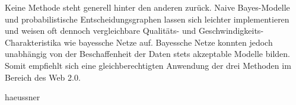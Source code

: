 \documentclass[a4paper,10pt,oneside]{scrartcl}
\begin{document}
Keine Methode steht generell hinter den anderen zurück. Naive Bayes-Modelle und probabilistische Entscheidungsgraphen lassen sich leichter implementieren und weisen oft dennoch vergleichbare Qualitäts- und Geschwindigkeits-Charakteristika wie bayessche Netze auf. Bayessche Netze konnten jedoch unabhängig von der Beschaffenheit der Daten stets akzeptable Modelle bilden. Somit empfiehlt sich eine gleichberechtigten Anwendung der drei Methoden im Bereich des Web 2.0. 

 {haeussner}

\end{document}
